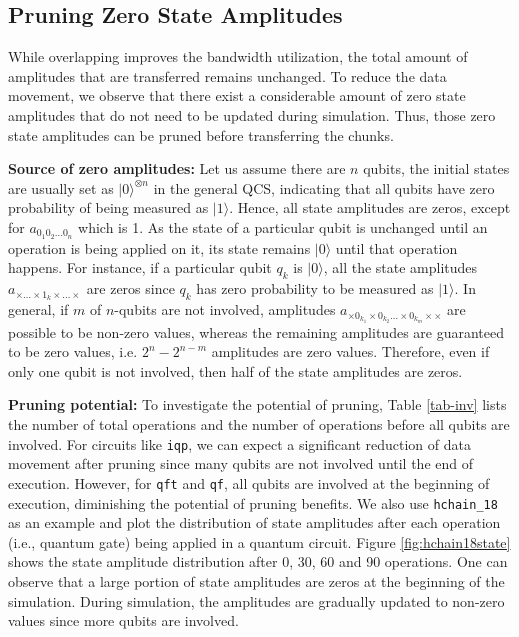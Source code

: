 \subsection{Pruning Zero State Amplitudes}
\label{sec:pruning}
\noindent While overlapping improves the bandwidth utilization, the total amount of amplitudes that are transferred remains unchanged. 
To reduce the data movement, we observe that there exist a considerable amount of zero state amplitudes that do not need to be updated during simulation.
Thus, those zero state amplitudes can be pruned before transferring the chunks. 
 
\noindent \textbf{Source of zero amplitudes:}
Let us assume there are $n$ qubits, the initial states are usually set as $|0\rangle^{\otimes{n}}$ in the general QCS, indicating that all qubits have zero probability of being measured as $|1\rangle$. 
Hence, all state amplitudes are zeros, except for $a_{0_{1}0_{2}\dots0_{n}}$ which is 1. As the state of a particular qubit is unchanged until an operation is being applied on it, its state remains $|0\rangle$ until that operation happens. 
For instance, if a particular qubit $q_k$ is $|0\rangle$, all the state amplitudes $a_{\times\dots\times1_{k}\times\dots\times}$ are zeros since $q_k$ has zero probability to be measured as $|1\rangle$. 
In general, if $m$ of $n$-qubits are not involved, amplitudes $a_{\times{0_{k_1}}\times{0_{k_2}}\dots\times{0_{k_m}}\times\times}$ are possible to be non-zero values, whereas the remaining amplitudes are guaranteed to be zero values, i.e. $2^n-2^{n-m}$ amplitudes are zero values.
Therefore, even if only one qubit is not involved, then half of the state amplitudes are zeros. 

\noindent \textbf{Pruning potential:}
To investigate the potential of pruning, Table \ref{tab-inv} lists the number of total operations and the number of operations before all qubits are involved. For circuits like {\tt iqp}, we can expect a significant reduction of data movement after pruning since many qubits are not involved until the end of execution. However, for {\tt qft} and {\tt qf}, all qubits are involved at the beginning of execution, diminishing the potential of pruning benefits.  
We also use {\tt hchain\_18} as an example and plot the distribution of state amplitudes after each operation (i.e., quantum gate) being applied in a quantum circuit. 
Figure \ref{fig:hchain18state} shows the state amplitude distribution after 0, 30, 60 and 90 operations. One can observe that a large portion of state amplitudes are zeros at the beginning of the simulation. During simulation, the amplitudes are gradually updated to non-zero values since more qubits are involved. 


